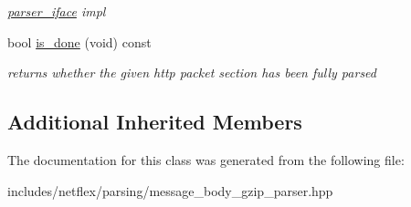 \begin{DoxyCompactItemize}
\begin{DoxyCompactList}\small\item\em \hyperlink{classnetflex_1_1parsing_1_1parser__iface}{parser\+\_\+iface} impl \end{DoxyCompactList}\item 
\mbox{\label{classnetflex_1_1parsing_1_1message__body__gzip__parser_a7751bc115acc99af5ab7d8f1a6de5581}} 
bool \hyperlink{classnetflex_1_1parsing_1_1message__body__gzip__parser_a7751bc115acc99af5ab7d8f1a6de5581}{is\+\_\+done} (void) const
\begin{DoxyCompactList}\small\item\em returns whether the given http packet section has been fully parsed \end{DoxyCompactList}\end{DoxyCompactItemize}
\subsection*{Additional Inherited Members}


The documentation for this class was generated from the following file\+:\begin{DoxyCompactItemize}
\item 
includes/netflex/parsing/message\+\_\+body\+\_\+gzip\+\_\+parser.\+hpp\end{DoxyCompactItemize}
